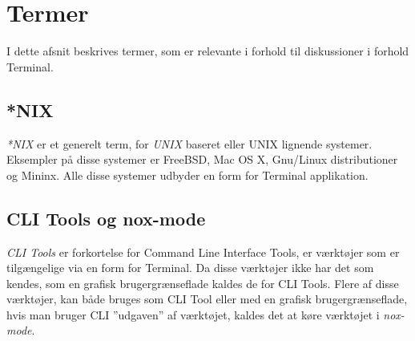 \section{Termer}
I dette afsnit beskrives termer, som er relevante i forhold til diskussioner i forhold Terminal. 
\subsection*{*NIX}
\emph{*NIX} er et generelt term, for \emph{UNIX} baseret eller UNIX lignende systemer. Eksempler på disse systemer er FreeBSD, Mac OS X, Gnu/Linux distributioner og Mininx. Alle disse systemer udbyder en form for Terminal applikation.

\subsection*{CLI Tools og nox-mode}
\emph{CLI Tools} er forkortelse for Command Line Interface Tools, er værktøjer som er tilgængelige via en form for Terminal. Da disse værktøjer ikke har det som kendes, som en grafisk brugergrænseflade kaldes de for CLI Tools. Flere af disse værktøjer, kan både bruges som CLI Tool eller med en grafisk brugergrænseflade, hvis man bruger CLI ''udgaven'' af værktøjet, kaldes det at køre værktøjet i \emph{nox-mode}.